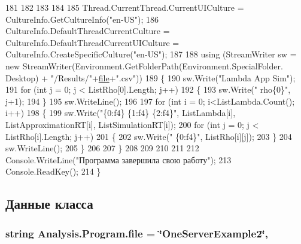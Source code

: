 \begin{DoxyCode}
181 
182 
183 
184 
185             Thread.CurrentThread.CurrentUICulture = CultureInfo.GetCultureInfo(\textcolor{stringliteral}{"en-US"});
186             CultureInfo.DefaultThreadCurrentCulture = CultureInfo.DefaultThreadCurrentUICulture = 
      CultureInfo.CreateSpecificCulture(\textcolor{stringliteral}{"en-US"});
187 
188             \textcolor{keyword}{using} (StreamWriter sw = \textcolor{keyword}{new} StreamWriter(Environment.GetFolderPath(Environment.SpecialFolder.
      Desktop) + \textcolor{stringliteral}{"/Results/"}+\hyperlink{class_analysis_1_1_program_abbd153e2a54cae09e6cbb7092163857f}{file}+\textcolor{stringliteral}{".csv"}))
189             \{
190                 sw.Write(\textcolor{stringliteral}{"Lambda App Sim"}); 
191                 \textcolor{keywordflow}{for} (\textcolor{keywordtype}{int} j = 0; j < ListRho[0].Length; j++)
192                 \{
193                     sw.Write(\textcolor{stringliteral}{" rho\{0\}"}, j+1); 
194                 \}
195                 sw.WriteLine(); 
196 
197                 \textcolor{keywordflow}{for} (\textcolor{keywordtype}{int} i = 0; i<ListLambda.Count(); i++)
198                 \{
199                     sw.Write(\textcolor{stringliteral}{"\{0:f4\} \{1:f4\} \{2:f4\}"}, ListLambda[i], ListApproximationRT[i], 
      ListSimulationRT[i]); 
200                     \textcolor{keywordflow}{for} (\textcolor{keywordtype}{int} j = 0; j < ListRho[i].Length; j++)
201                     \{
202                         sw.Write(\textcolor{stringliteral}{" \{0:f4\}"}, ListRho[i][j]); 
203                     \}
204                     sw.WriteLine(); 
205                 \}
206                               
207             \}
208 
209 
210 
211 
212             Console.WriteLine(\textcolor{stringliteral}{"Программа завершила свою работу"});
213             Console.ReadKey(); 
214         \}
\end{DoxyCode}


\subsection{Данные класса}
\subsubsection[{\texorpdfstring{file}{file}}]{\setlength{\rightskip}{0pt plus 5cm}string Analysis.\+Program.\+file = \char`\"{}One\+Server\+Example2\char`\"{}\hspace{0.3cm}{\ttfamily [static]}, {\ttfamily [private]}}\hypertarget{class_analysis_1_1_program_abbd153e2a54cae09e6cbb7092163857f}{}\label{class_analysis_1_1_program_abbd153e2a54cae09e6cbb7092163857f}


